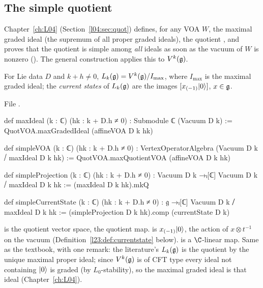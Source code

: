 \subsection{The simple quotient}

Chapter~\ref{ch:L04} (Section~\ref{l04:sec:quot}) defines, for any VOA $W$, the maximal graded ideal
 (the supremum of all proper graded ideals), the quotient , and proves that
the quotient is simple among \emph{all} ideals as soon as the vacuum of $W$ is nonzero
(). The general construction applies this to $V^k(\mathfrak g)$.

\begin{definition}\label{l23:def:simpleVOA}
For Lie data $D$ and $k+h\ne0$, $L_k(\mathfrak g)=V^k(\mathfrak g)/I_{\max}$, where $I_{\max}$ is the maximal graded ideal; the
\emph{current states} of $L_k(\mathfrak g)$ are the images $[x_{(-1)}|0\rangle]$, $x\in\mathfrak g$.
\end{definition}
\noindent File .
\begin{leancode}
def maxIdeal (k : ℂ) (hk : k + D.h ≠ 0) : Submodule ℂ (Vacuum D k) :=
  QuotVOA.maxGradedIdeal (affineVOA D k hk)

def simpleVOA (k : ℂ) (hk : k + D.h ≠ 0) : VertexOperatorAlgebra (Vacuum D k ⧸ maxIdeal D k hk) :=
  QuotVOA.maxQuotientVOA (affineVOA D k hk)

def simpleProjection (k : ℂ) (hk : k + D.h ≠ 0) : Vacuum D k →ₗ[ℂ] Vacuum D k ⧸ maxIdeal D k hk :=
  (maxIdeal D k hk).mkQ

def simpleCurrentState (k : ℂ) (hk : k + D.h ≠ 0) : 𝔤 →ₗ[ℂ] Vacuum D k ⧸ maxIdeal D k hk :=
  (simpleProjection D k hk).comp (currentState D k)
\end{leancode}

\begin{dictionary}
 is the quotient vector space,  the quotient map.  is
$x_{(-1)}|0\rangle$, the action of $x\otimes t^{-1}$ on the vacuum (Definition~\ref{l23:def:currentstate} below).
 is a $\C$-linear map. Same as the textbook, with one remark: the literature's $L_k(\mathfrak g)$ is the quotient
by the unique maximal proper ideal; since $V^k(\mathfrak g)$ is of CFT type every ideal not containing $|0\rangle$ is graded (by
$L_0$-stability), so the maximal graded ideal is that ideal (Chapter~\ref{ch:L04}).
\end{dictionary}

